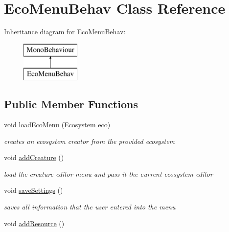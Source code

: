 \hypertarget{class_eco_menu_behav}{}\section{Eco\+Menu\+Behav Class Reference}
\label{class_eco_menu_behav}
Inheritance diagram for Eco\+Menu\+Behav\+:\begin{figure}[H]
\begin{center}
\leavevmode
\includegraphics[height=2.000000cm]{class_eco_menu_behav}
\end{center}
\end{figure}
\subsection*{Public Member Functions}
\begin{DoxyCompactItemize}
\item 
void \mbox{\hyperlink{class_eco_menu_behav_a039f9149186291b27affa208529483dc}{load\+Eco\+Menu}} (\mbox{\hyperlink{class_ecosystem}{Ecosystem}} eco)
\begin{DoxyCompactList}\small\item\em creates an ecosystem creator from the provided ecosystem \end{DoxyCompactList}\item 
void \mbox{\hyperlink{class_eco_menu_behav_adbbf966a393af0f1d5893ea17f694dc1}{add\+Creature}} ()
\begin{DoxyCompactList}\small\item\em load the creature editor menu and pass it the current ecosystem editor \end{DoxyCompactList}\item 
void \mbox{\hyperlink{class_eco_menu_behav_a8ea8d6da55e1a0724a33e59ff0b94834}{save\+Settings}} ()
\begin{DoxyCompactList}\small\item\em saves all information that the user entered into the menu \end{DoxyCompactList}\item 
void \mbox{\hyperlink{class_eco_menu_behav_ab08a4156dfbc7df76014ce6dbe6c9577}{add\+Resource}} ()
\end{DoxyCompactItemize}
